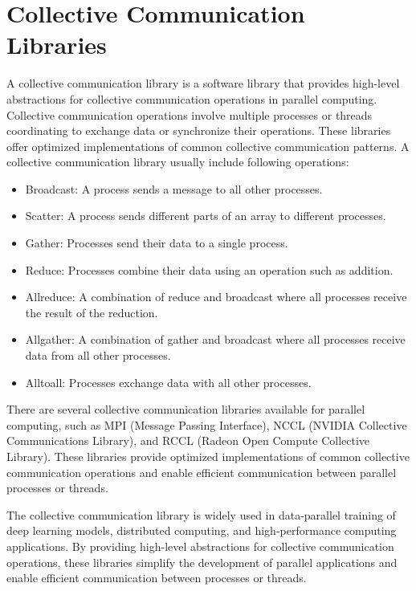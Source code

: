 \section {Collective Communication Libraries}

A collective communication library is a software library that provides
high-level abstractions for collective communication operations in
parallel computing. Collective communication operations involve
multiple processes or threads coordinating to exchange data or
synchronize their operations. These libraries offer optimized
implementations of common collective communication patterns.
A collective communication library usually include following operations:

\begin{itemize}
    \item Broadcast: A process sends a message to all other processes.
    \item Scatter: A process sends different parts of an array to
    different processes.
    \item Gather: Processes send their data to a single process.
    \item Reduce: Processes combine their data using an operation such as
    addition.
    \item Allreduce: A combination of reduce and broadcast where all
    processes receive the result of the reduction.
    \item Allgather: A combination of gather and broadcast where all
    processes receive data from all other processes.
    \item Alltoall: Processes exchange data with all other processes.
\end{itemize}


There are several collective communication libraries available for
parallel computing, such as MPI (Message Passing Interface), NCCL
(NVIDIA Collective Communications Library), and RCCL (Radeon Open
Compute Collective Library). These libraries provide optimized
implementations of common collective communication operations and
enable efficient communication between parallel processes or threads.

The collective communication library is widely used in data-parallel
training of deep learning models, distributed computing, and
high-performance computing applications. By providing high-level
abstractions for collective communication operations, these libraries
simplify the development of parallel applications and enable efficient
communication between processes or threads.